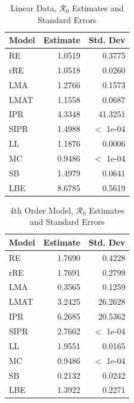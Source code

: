 \documentclass[12pt]{article}
\newcommand{\rr}{\ensuremath{\mathcal{R}_0}}
\begin{document}
\begin{table}[H]
	
	\centering
	\begin{tabular}[t]{l|r|r}
		\hline
		Model & Estimate & Std. Dev\\
		\hline
		RE & 1.0519 & 0.3775\\
		\hline
		rRE & 1.0518 & 0.0260\\
		\hline
		LMA & 1.2766 & 0.1573\\
		\hline
		LMAT & 1.1558 & 0.0687\\
		\hline
		IPR & 4.3348 & 41.3251\\
		\hline
		SIPR & 1.4988 & $<$ 1e-04\\
		\hline
		LL & 1.1876 & 0.0006\\
		\hline
		MC & 0.9486 & $<$ 1e-04\\
		\hline
		SB & 1.4979 & 0.0641\\
		\hline
		LBE & 8.6785 & 0.5619\\
		\hline
	\end{tabular}
	\caption{Linear Data, $\rr$ Estimates and Standard Errors}
\end{table}

\begin{table}[H]
	
	
	\centering
	\begin{tabular}[t]{l|r|r}
		\hline
		Model & Estimate & Std. Dev\\
		\hline
		RE & 1.7690 & 0.4228\\
		\hline
		rRE & 1.7691 & 0.2799\\
		\hline
		LMA & 0.3565 & 0.1259\\
		\hline
		LMAT & 3.2425 & 26.2628\\
		\hline
		IPR & 6.2685 & 20.5362\\
		\hline
		SIPR & 2.7662 & $<$ 1e-04\\
		\hline
		LL & 1.9551 & 0.0165\\
		\hline
		MC & 0.9486 & $<$ 1e-04\\
		\hline
		SB & 0.2132 & 0.0242\\
		\hline
		LBE & 1.3922 & 0.2271\\
		\hline
	\end{tabular}
	\caption{4th Order Model, $\rr$ Estimates and Standard Errors}
\end{table}
\end{document}
